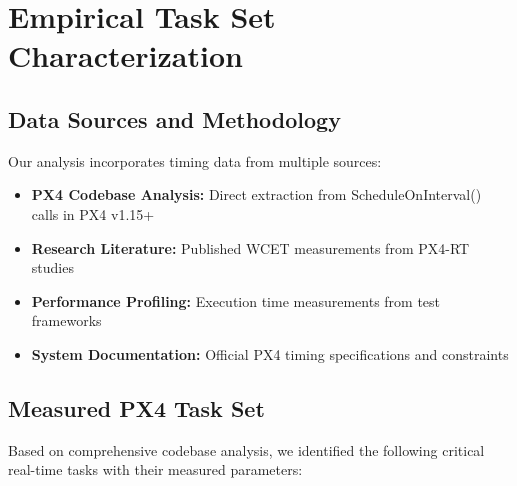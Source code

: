 \documentclass[12pt,a4paper]{article}
\begin{document}
\section{Empirical Task Set Characterization}

\subsection{Data Sources and Methodology}

Our analysis incorporates timing data from multiple sources:

\begin{itemize}
\item \textbf{PX4 Codebase Analysis:} Direct extraction from ScheduleOnInterval() calls in PX4 v1.15+
\item \textbf{Research Literature:} Published WCET measurements from PX4-RT studies
\item \textbf{Performance Profiling:} Execution time measurements from test frameworks
\item \textbf{System Documentation:} Official PX4 timing specifications and constraints
\end{itemize}

\subsection{Measured PX4 Task Set}

Based on comprehensive codebase analysis, we identified the following critical real-time tasks with their measured parameters:
\end{document}
